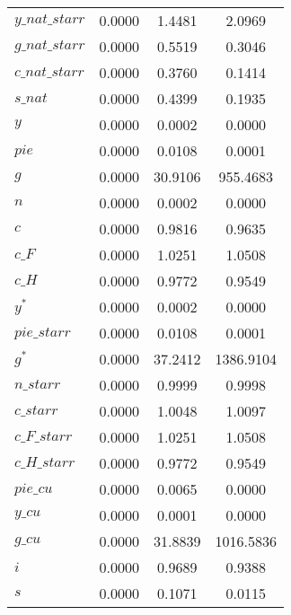 \begin{center}
\begin{longtable}{lccc}
$y\_nat\_starr  $	 & 	       0.0000	 & 	       1.4481	 & 	       2.0969 \\ 
$g\_nat\_starr  $	 & 	       0.0000	 & 	       0.5519	 & 	       0.3046 \\ 
$c\_nat\_starr  $	 & 	       0.0000	 & 	       0.3760	 & 	       0.1414 \\ 
$s\_nat         $	 & 	       0.0000	 & 	       0.4399	 & 	       0.1935 \\ 
${y}            $	 & 	       0.0000	 & 	       0.0002	 & 	       0.0000 \\ 
$pie            $	 & 	       0.0000	 & 	       0.0108	 & 	       0.0001 \\ 
${g}            $	 & 	       0.0000	 & 	      30.9106	 & 	     955.4683 \\ 
$n              $	 & 	       0.0000	 & 	       0.0002	 & 	       0.0000 \\ 
$c              $	 & 	       0.0000	 & 	       0.9816	 & 	       0.9635 \\ 
$c\_F           $	 & 	       0.0000	 & 	       1.0251	 & 	       1.0508 \\ 
$c\_H           $	 & 	       0.0000	 & 	       0.9772	 & 	       0.9549 \\ 
${y^*}          $	 & 	       0.0000	 & 	       0.0002	 & 	       0.0000 \\ 
$pie\_starr     $	 & 	       0.0000	 & 	       0.0108	 & 	       0.0001 \\ 
${g^*}          $	 & 	       0.0000	 & 	      37.2412	 & 	    1386.9104 \\ 
$n\_starr       $	 & 	       0.0000	 & 	       0.9999	 & 	       0.9998 \\ 
$c\_starr       $	 & 	       0.0000	 & 	       1.0048	 & 	       1.0097 \\ 
$c\_F\_starr    $	 & 	       0.0000	 & 	       1.0251	 & 	       1.0508 \\ 
$c\_H\_starr    $	 & 	       0.0000	 & 	       0.9772	 & 	       0.9549 \\ 
$pie\_cu        $	 & 	       0.0000	 & 	       0.0065	 & 	       0.0000 \\ 
$y\_cu          $	 & 	       0.0000	 & 	       0.0001	 & 	       0.0000 \\ 
$g\_cu          $	 & 	       0.0000	 & 	      31.8839	 & 	    1016.5836 \\ 
${i}            $	 & 	       0.0000	 & 	       0.9689	 & 	       0.9388 \\ 
${s}            $	 & 	       0.0000	 & 	       0.1071	 & 	       0.0115 \\ 
\end{longtable}
 \end{center}
